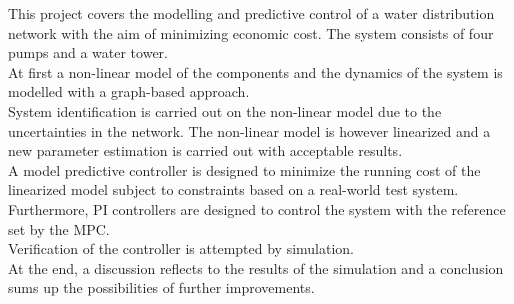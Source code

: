 


This project covers the modelling and predictive control of a water distribution network with the aim of minimizing economic cost. The system consists of four pumps and a water tower.\\
At first a non-linear model of the components and the dynamics of the system is modelled with a graph-based approach.\\ 
System identification is carried out on the non-linear model due to the uncertainties in the network. The non-linear model is however linearized and a new parameter estimation is carried out with acceptable results. \\
A model predictive controller is designed to minimize the running cost of the linearized model subject to constraints based on a real-world test system. Furthermore, PI controllers are designed to control the system with the reference set by the MPC. \\
Verification of the controller is attempted by simulation.\\
At the end, a discussion reflects to the results of the simulation and a conclusion sums up the possibilities of further improvements. 





